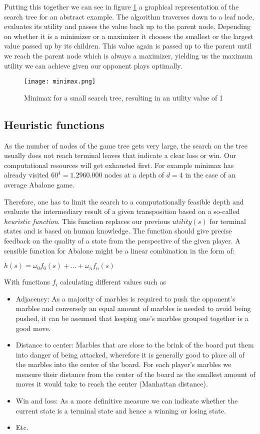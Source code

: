 Putting this together we can see in figure \ref{minimax} a graphical representation of the search tree for an abstract example. The algorithm traverses down to a leaf node, evaluates its utility and passes the value back up to the parent node. Depending on whether it is a minimizer or a maximizer it chooses the smallest or the largest value passed up by its children. This value again is passed up to the parent until we reach the parent node which is always a maximizer, yielding us the maximum utility we can achieve given our opponent plays optimally.

\begin{figure}
    \centering
    \texttt{[image: minimax.png]}
    \caption{Minimax for a small search tree, resulting in an utility value of 1}
    \label{minimax}
\end{figure}

\subsection{Heuristic functions}
As the number of nodes of the game tree gets very large, the search on the tree usually does not reach terminal leaves that indicate a clear loss or win. Our computational resources will get exhausted first. For example minimax has already visited $ 60 ^ 4 = 1.2960.000 $ nodes at a depth of $ d = 4 $ in the case of an average Abalone game.

Therefore, one has to limit the search to a computationally feasible depth and evaluate the intermediary result of a given transposition based on a so-called \textit{heuristic function}. This function replaces our previous $ utility(s) $ for terminal states and is based on human knowledge. The function should give precise feedback on the quality of a state from the perspective of the given player. A sensible function for Abalone might be a linear combination in the form of:

$ h(s) = \omega_0f_0(s) + ... + \omega_nf_n(s) $

With functions $ f_i $ calculating different values such as

\begin{itemize}
    \item Adjacency: As a majority of marbles is required to push the opponent's marbles and conversely an equal amount of marbles is needed to avoid being pushed, it can be assumed that keeping one's marbles grouped together is a good move.
    \item Distance to center: Marbles that are close to the brink of the board put them into danger of being attacked, wherefore it is generally good to place all of the marbles into the center of the board. For each player's marbles we measure their distance from the center of the board as the smallest amount of moves it would take to reach the center (Manhattan distance).
    \item Win and loss: As a more definitive measure we can indicate whether the current state is a terminal state and hence a winning or losing state.
    \item Etc.
\end{itemize}

